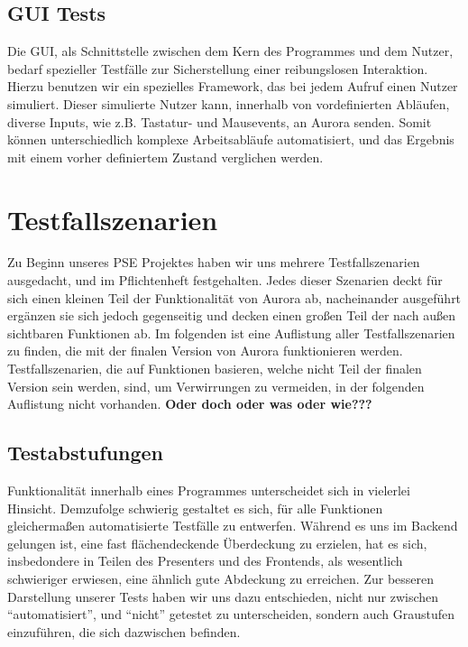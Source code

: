 \documentclass[parskip=full,11pt,twoside]{scrartcl}
\begin{document}
\subsection{GUI Tests}
Die GUI, als Schnittstelle zwischen dem Kern des Programmes und dem Nutzer, bedarf spezieller Testfälle zur Sicherstellung einer reibungslosen Interaktion.
Hierzu benutzen wir ein spezielles Framework, das bei jedem Aufruf einen Nutzer simuliert.
Dieser simulierte Nutzer kann, innerhalb von vordefinierten Abläufen, diverse Inputs, wie z.B. Tastatur- und Mausevents, an Aurora senden.
Somit können unterschiedlich komplexe Arbeitsabläufe automatisiert, und das Ergebnis mit einem vorher definiertem Zustand verglichen werden.


\section{Testfallszenarien}
Zu Beginn unseres PSE Projektes haben wir uns mehrere Testfallszenarien ausgedacht, und im Pflichtenheft festgehalten.
Jedes dieser Szenarien deckt für sich einen kleinen Teil der Funktionalität von Aurora ab, nacheinander ausgeführt ergänzen sie sich jedoch gegenseitig und decken einen großen Teil der nach außen sichtbaren Funktionen ab.
Im folgenden ist eine Auflistung aller Testfallszenarien zu finden, die mit der finalen Version von Aurora funktionieren werden.
Testfallszenarien, die auf Funktionen basieren, welche nicht Teil der finalen Version sein werden, sind, um Verwirrungen zu vermeiden, in der folgenden Auflistung nicht vorhanden.
\newline
\textbf{Oder doch oder was oder wie???}

\subsection{Testabstufungen}
Funktionalität innerhalb eines Programmes unterscheidet sich in vielerlei Hinsicht.
Demzufolge schwierig gestaltet es sich, für alle Funktionen gleichermaßen automatisierte Testfälle zu entwerfen.
Während es uns im Backend gelungen ist, eine fast flächendeckende Überdeckung zu erzielen, hat es sich, insbedondere in Teilen des Presenters und des Frontends, als wesentlich schwieriger erwiesen, eine ähnlich gute Abdeckung zu erreichen.
Zur besseren Darstellung unserer Tests haben wir uns dazu entschieden, nicht nur zwischen \enquote{automatisiert}, und \enquote{nicht} getestet zu unterscheiden, sondern auch Graustufen einzuführen, die sich dazwischen befinden.
\end{document}

